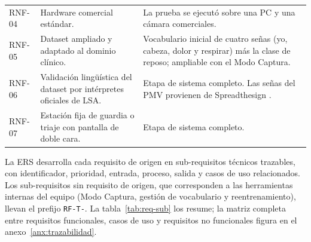 \begin{longtable}{>{\raggedright\arraybackslash}p{1.5cm} >{\raggedright\arraybackslash}p{6.0cm} >{\raggedright\arraybackslash}p{7.1cm}}
  RNF-04 & Hardware comercial estándar. & La prueba se ejecutó sobre una PC y una cámara comerciales. \\
  RNF-05 & Dataset ampliado y adaptado al dominio clínico. & Vocabulario inicial de cuatro señas (yo, cabeza, dolor y respirar) más la clase de reposo; ampliable con el Modo Captura. \\
  RNF-06 & Validación lingüística del dataset por intérpretes oficiales de LSA. & Etapa de sistema completo. Las señas del PMV provienen de Spreadthesign \parencite{spreadthesign}. \\
  RNF-07 & Estación fija de guardia o triaje con pantalla de doble cara. & Etapa de sistema completo. \\
  \bottomrule
\end{longtable}

La ERS desarrolla cada requisito de origen en sub-requisitos técnicos trazables, con identificador, prioridad, entrada, proceso, salida y casos de uso relacionados. Los sub-requisitos sin requisito de origen, que corresponden a las herramientas internas del equipo (Modo Captura, gestión de vocabulario y reentrenamiento), llevan el prefijo \texttt{RF-T-}. La tabla~\ref{tab:req-sub} los resume; la matriz completa entre requisitos funcionales, casos de uso y requisitos no funcionales figura en el anexo~\ref{anx:trazabilidad}.

